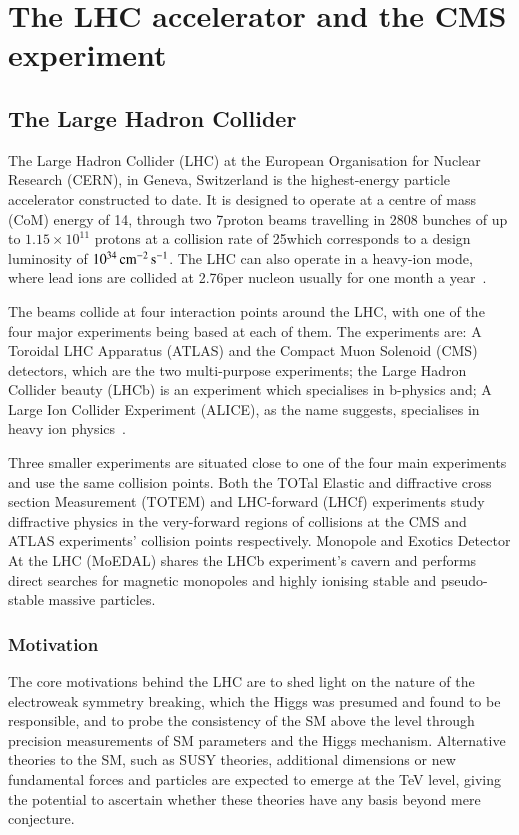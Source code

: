 \section{The LHC accelerator and the CMS experiment}\label{sec:lhc-cms}
\subsection{The Large Hadron Collider}\label{subsec:lhc}

The Large Hadron Collider (LHC) at the European Organisation for Nuclear Research (CERN), in Geneva, Switzerland is the highest-energy particle accelerator constructed to date. 
It is designed to operate at a centre of mass (CoM) energy of 14\TeV, through two 7\TeV proton beams travelling in 2808 bunches of up to $1.15 \times 10^{11}$ protons at a collision rate of 25\nsm which corresponds to a design luminosity of $10^{34}\,\text{cm}^\text{$-$2}\,\text{s}^\text{$-$1}$. 
The LHC can also operate in a heavy-ion mode, where lead ions are collided at 2.76\TeV per nucleon usually for one month a year~\cite{Bayatian:2006zz}.

The beams collide at four interaction points around the LHC, with one of the four major experiments being based at each of them. 
The experiments are: A Toroidal LHC Apparatus (ATLAS) and the Compact Muon Solenoid (CMS) detectors, which are the two multi-purpose experiments; the Large Hadron Collider beauty (LHCb) is an experiment which specialises in b-physics and; A Large Ion Collider Experiment (ALICE), as the name suggests, specialises in heavy ion physics~\cite{Bruning:782076}.

Three smaller experiments are situated close to one of the four main experiments and use the same collision points.
Both the TOTal Elastic and diffractive cross section Measurement (TOTEM) and LHC-forward (LHCf) experiments study diffractive physics in the very-forward regions of collisions at the CMS and ATLAS experiments' collision points respectively.
Monopole and Exotics Detector At the LHC (MoEDAL) shares the LHCb experiment's cavern and performs direct searches for magnetic monopoles and highly ionising stable and pseudo-stable massive particles.

\subsubsection{Motivation}
The core motivations behind the LHC are to shed light on the nature of the electroweak symmetry breaking, which the Higgs was presumed and found to be responsible, and to probe the consistency of the SM above the \TeV level through precision measurements of SM parameters and the Higgs mechanism.
Alternative theories to the SM, such as SUSY theories, additional dimensions or new fundamental forces and particles are expected to emerge at the TeV level, giving the potential to ascertain whether these theories have any basis beyond mere conjecture.

